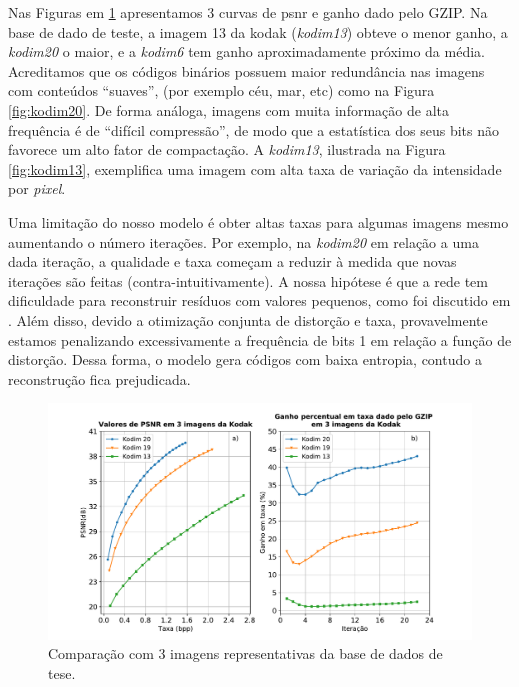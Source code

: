 


Nas Figuras em \ref{fig:comp_gain_psnr} apresentamos 3 curvas de \acrshort{psnr} e ganho dado pelo GZIP. Na base de dado de teste, a imagem 13 da kodak (\textit{kodim13})  obteve o menor ganho, a \textit{kodim20} o maior, e a \textit{kodim6} tem ganho aproximadamente próximo da média. 
Acreditamos que os códigos binários possuem maior redundância nas imagens com conteúdos ``suaves'', (por exemplo céu, mar, etc) como na Figura \ref{fig:kodim20}. 
De forma análoga, imagens com muita informação de alta frequência é de ``difícil compressão'', 
de modo que a estatística dos seus bits não favorece um alto fator de compactação. A \textit{kodim13}, ilustrada na Figura \ref{fig:kodim13}, exemplifica uma imagem com alta taxa de variação da intensidade por \textit{pixel}. 

Uma limitação do nosso modelo é obter altas taxas para algumas imagens mesmo aumentando o número iterações. Por exemplo, na \textit{kodim20}  em relação a uma dada iteração, a qualidade e taxa começam a reduzir à medida que novas iterações são feitas (contra-intuitivamente). A nossa hipótese é que a rede tem dificuldade para reconstruir resíduos com valores pequenos, como foi discutido em \cite{FullResolution2017Toderici}.  Além disso, devido a otimização conjunta de distorção e taxa, provavelmente estamos penalizando excessivamente a frequência de bits 1 em relação a função de distorção. Dessa forma, o modelo gera códigos com baixa entropia, contudo a reconstrução fica prejudicada.   


\begin{figure}
	\centering
	\includegraphics[width=1.0\textwidth]{figuras/comp_gain_psnr.pdf}
	\caption[Comparação em 3 imagens representativas da Kodak.]{Comparação com  3 imagens representativas da base de dados de tese.}   	
	\label{fig:comp_gain_psnr}
\end{figure}


